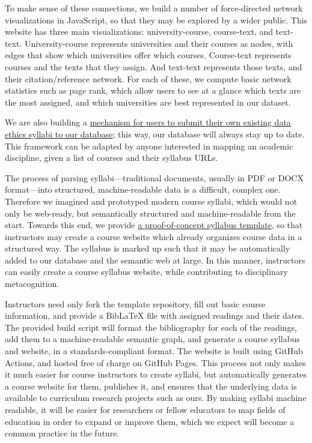 \documentclass[
]{article}
\begin{document}
To make sense of these connections, we build a number of force-directed
network visualizations in JavaScript, so that they may be explored by a
wider public. This website has three main visualizations:
university-course, course-text, and text-text. University-course
represents universities and their courses as nodes, with edges that show
which universities offer which courses. Course-text represents courses
and the texts that they assign. And text-text represents those texts,
and their citation/reference network. For each of these, we compute
basic network statistics such as page rank, which allow users to see at
a glance which texts are the most assigned, and which universities are
best represented in our dataset.

We are also building a \href{https://data-ethics.net/submit}{mechanism
for users to submit their own existing data ethics syllabi to our
database}; this way, our database will always stay up to date. This
framework can be adapted by anyone interested in mapping an academic
discipline, given a list of courses and their syllabus URLs.

The process of parsing syllabi---traditional documents, usually in PDF
or DOCX format---into structured, machine-readable data is a difficult,
complex one. Therefore we imagined and prototyped modern course syllabi,
which would not only be web-ready, but semantically structured and
machine-readable from the start. Towards this end, we provide
\href{https://github.com/JonathanReeve/template-course-website}{a
proof-of-concept syllabus template}, so that instructors may create a
course website which already organizes course data in a structured way.
The syllabus is marked up such that it may be automatically added to our
database and the semantic web at large. In this manner, instructors can
easily create a course syllabus website, while contributing to
disciplinary metacognition.

Instructors need only fork the template repository, fill out basic
course information, and provide a BibLaTeX file with assigned readings
and their dates. The provided build script will format the bibliography
for each of the readings, add them to a machine-readable semantic graph,
and generate a course syllabus and website, in a standards-compliant
format. The website is built using GitHub Actions, and hosted free of
charge on GitHub Pages. This process not only makes it much easier for
course instructors to create syllabi, but automatically generates a
course website for them, publishes it, and ensures that the underlying
data is available to curriculum research projects such as ours. By
making syllabi machine readable, it will be easier for researchers or
fellow educators to map fields of education in order to expand or
improve them, which we expect will become a common practice in the
future.
\end{document}
